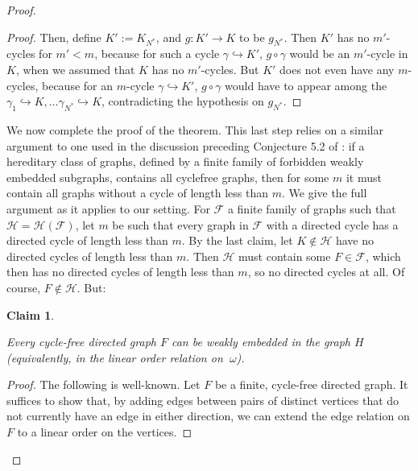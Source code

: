 \documentclass{amsart}
\newtheorem{claim}[theorem]{Claim}
\theoremstyle{definition}
\theoremstyle{remark}
\numberwithin{equation}{section}
\begin{document}
\begin{proof}
\begin{proof}
Then, define $K':= K_{N^{*}}$, and $g: K' \to K$ to be $g_{N^{*}}$. Then $K'$ has no $m'$-cycles for $m' < m$, because for such a cycle $\gamma \hookrightarrow K'$, $g \circ \gamma$ would be an $m'$-cycle in $K$, when we assumed that $K$ has no $m'$-cycles. But $K'$ does not even have any $m$-cycles, because for an $m$-cycle $\gamma \hookrightarrow K'$, $g \circ \gamma$ would have to appear among the $\gamma_{1} \hookrightarrow K, \ldots \gamma_{N^{*}} \hookrightarrow K$, contradicting the hypothesis on $g_{N^{*}}$.
    
\end{proof}

We now complete the proof of the theorem. This last step relies on a similar argument to one used in the discussion preceding Conjecture 5.2 of \cite{LZ17}: if a hereditary class of graphs, defined by a finite family of forbidden weakly embedded subgraphs, contains all cyclefree graphs, then for some $m$ it must contain all graphs without a cycle of length less than $m$. We give the full argument as it applies to our setting. For $\mathcal{F}$ a finite family of graphs such that $\mathcal{H} = \mathcal{H}(\mathcal{F})$, let $m$ be such that every graph in $\mathcal{F}$ with a directed cycle has a directed cycle of length less than $m$. By the last claim, let $K \notin \mathcal{H}$ have no directed cycles of length less than $m$. Then $\mathcal{H}$ must contain some $F \in \mathcal{F}$, which then has no directed cycles of length less than $m$, so no directed cycles at all. Of course, $F \notin \mathcal{H}$. But:

\begin{claim}\label{every cycle-free graph embeds in the linear order}

Every cycle-free directed graph $F$ can be weakly embedded in the graph $H$ (equivalently, in the linear order relation on $\
\omega$).

    
\end{claim}

\begin{proof}
    The following is well-known. Let $F$ be a finite, cycle-free directed graph. It suffices to show that, by adding edges between pairs of distinct vertices that do not currently have an edge in either direction, we can extend the edge relation on $F$ to a linear order on the vertices.
   

\end{proof}
\end{proof}
\end{document}
